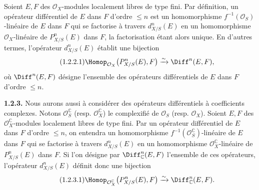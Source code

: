 \documentclass[11pt]{article}
\providecommand{\cO}{\mathcal O}
\begin{document}
Soient $E,F$ des $\cO_X$-modules localement libres de type fini. Par définition, un opérateur différentiel de $E$ dans $F$ d'ordre $\le n$ est un homomorphisme $f^{-1}(\cO_S)$-linéaire de $E$ dans $F$ qui se factorise à travers $d^n_{X/S}(E)$ en un homomorphisme $\cO_X$-linéaire de $P^n_{X/S}(E)$ dans $F$, la factorisation étant alors unique. En d'autres termes, l'opérateur $d^n_{X/S}(E)$ établit une bijection
\begin{equation}\tag{1.2.2.1}
  \Homop_{\cO_X}\bigl(P^n_{X/S}(E),F\bigr)
  \xrightarrow{\sim}
  \Diff^n(E,F),
\end{equation}
où $\Diff^n(E,F)$ désigne l'ensemble des opérateurs différentiels de $E$ dans $F$ d'ordre $\le n$.

\textbf{1.2.3.} Nous aurons aussi à considérer des opérateurs différentiels à coefficients complexes. Notons $\cO_S^\mathbb C$ (resp. $\cO_X^\mathbb C$) le complexifié de $\cO_S$ (resp. $\cO_X$). Soient $E,F$ des $\cO_X^\mathbb C$-modules localement libres de type fini. Par un opérateur différentiel de $E$ dans $F$ d'ordre $\le n$, on entendra un homomorphisme $f^{-1}(\cO_S^\mathbb C)$-linéaire de $E$ dans $F$ qui se factorise à travers $d^n_{X/S}(E)$ en un homomorphisme $\cO_X^\mathbb C$-linéaire de $P^n_{X/S}(E)$ dans $F$. Si l'on désigne par $\Diff^n_\mathbb C(E,F)$ l'ensemble de ces opérateurs, l'opérateur $d^n_{X/S}(E)$ définit donc une bijection
\begin{equation}\tag{1.2.3.1}
  \Homop_{\cO_X^\mathbb C}\bigl(P^n_{X/S}(E),F\bigr)
  \xrightarrow{\sim}
  \Diff^n_\mathbb C(E,F).
\end{equation}
\end{document}
